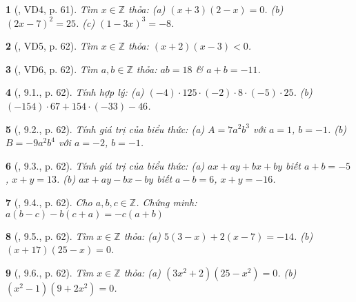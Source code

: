\documentclass{article}
\newtheorem{baitoan}{}
\begin{document}
\begin{baitoan}[\cite{Binh_boi_duong_Toan_6_tap_1}, VD4, p. 61]
	Tìm $x\in\mathbb{Z}$ thỏa: (a) $(x + 3)(2 - x) = 0$. (b) $(2x - 7)^2 = 25$. (c) $(1 - 3x)^3 = -8$.
\end{baitoan}

\begin{baitoan}[\cite{Binh_boi_duong_Toan_6_tap_1}, VD5, p. 62]
	Tìm $x\in\mathbb{Z}$ thỏa: $(x + 2)(x - 3) < 0$.
\end{baitoan}

\begin{baitoan}[\cite{Binh_boi_duong_Toan_6_tap_1}, VD6, p. 62]
	Tìm $a,b\in\mathbb{Z}$ thỏa: $ab = 18$ \& $a + b = -11$.
\end{baitoan}

\begin{baitoan}[\cite{Binh_boi_duong_Toan_6_tap_1}, 9.1., p. 62]
	Tính hợp lý: (a) $(-4)\cdot125\cdot(-2)\cdot8\cdot(-5)\cdot25$. (b) $(-154)\cdot67 + 154\cdot(-33) - 46$.
\end{baitoan}

\begin{baitoan}[\cite{Binh_boi_duong_Toan_6_tap_1}, 9.2., p. 62]
	Tính giá trị của biểu thức: (a) $A = 7a^2b^3$ với $a = 1$, $b = -1$. (b) $B = -9a^2b^4$ với $a = -2$, $b = -1$.
\end{baitoan}

\begin{baitoan}[\cite{Binh_boi_duong_Toan_6_tap_1}, 9.3., p. 62]
	Tính giá trị của biểu thức: (a) $ax + ay + bx + by$ biết $a + b = -5$, $x + y = 13$. (b) $ax + ay - bx - by$ biết $a - b = 6$, $x + y = -16$.
\end{baitoan}

\begin{baitoan}[\cite{Binh_boi_duong_Toan_6_tap_1}, 9.4., p. 62]
	Cho $a,b,c\in\mathbb{Z}$. Chứng minh: $a(b - c) - b(c + a) = -c(a + b)$
\end{baitoan}

\begin{baitoan}[\cite{Binh_boi_duong_Toan_6_tap_1}, 9.5., p. 62]
	Tìm $x\in\mathbb{Z}$ thỏa: (a) $5(3 - x) + 2(x - 7) = -14$. (b) $(x + 17)(25 - x) = 0$.
\end{baitoan}

\begin{baitoan}[\cite{Binh_boi_duong_Toan_6_tap_1}, 9.6., p. 62]
	Tìm $x\in\mathbb{Z}$ thỏa: (a) $(3x^2 + 2)(25 - x^2) = 0$. (b) $(x^2 - 1)(9 + 2x^2) = 0$.
\end{baitoan}
\end{document}
